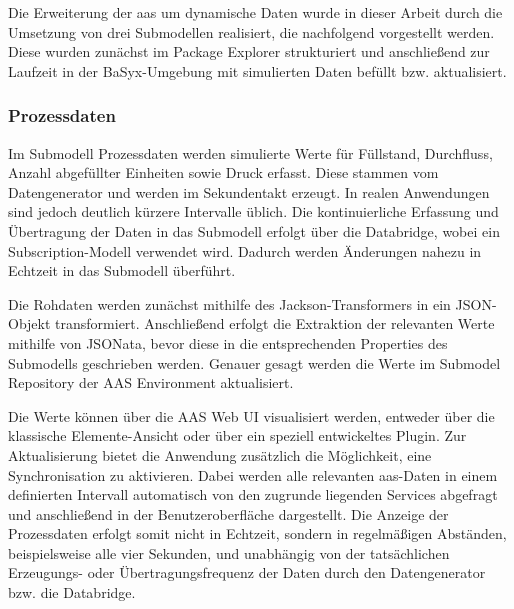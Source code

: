 Die Erweiterung der \acs{aas} um dynamische Daten wurde in dieser Arbeit durch die Umsetzung von drei Submodellen realisiert, die nachfolgend vorgestellt werden. 
Diese wurden zunächst im Package Explorer strukturiert und anschließend zur Laufzeit in der BaSyx-Umgebung mit simulierten Daten befüllt bzw. aktualisiert.

\subsubsection*{Prozessdaten}
\vspace{-0.5em}

Im Submodell Prozessdaten werden simulierte Werte für Füllstand, Durchfluss, Anzahl abgefüllter Einheiten sowie Druck erfasst.
Diese stammen vom Datengenerator und werden im Sekundentakt erzeugt.
In realen Anwendungen sind jedoch deutlich kürzere Intervalle üblich.
Die kontinuierliche Erfassung und Übertragung der Daten in das Submodell erfolgt über die Databridge, wobei ein Subscription-Modell verwendet wird.
Dadurch werden Änderungen nahezu in Echtzeit in das Submodell überführt.

Die Rohdaten werden zunächst mithilfe des Jackson-Transformers in ein JSON-Objekt transformiert.
Anschließend erfolgt die Extraktion der relevanten Werte mithilfe von JSONata, bevor diese in die entsprechenden Properties des Submodells geschrieben werden.
Genauer gesagt werden die Werte im Submodel Repository der AAS Environment aktualisiert.

Die Werte können über die AAS Web UI visualisiert werden, entweder über die klassische Elemente-Ansicht oder über ein speziell entwickeltes Plugin.
Zur Aktualisierung bietet die Anwendung zusätzlich die Möglichkeit, eine Synchronisation zu aktivieren.
Dabei werden alle relevanten \acs{aas}-Daten in einem definierten Intervall automatisch von den zugrunde liegenden Services abgefragt und anschließend in der Benutzeroberfläche dargestellt.
Die Anzeige der Prozessdaten erfolgt somit nicht in Echtzeit, sondern in regelmäßigen Abständen, beispielsweise alle vier Sekunden, und unabhängig von der tatsächlichen Erzeugungs- oder Übertragungsfrequenz der Daten durch den Datengenerator bzw. die Databridge.


